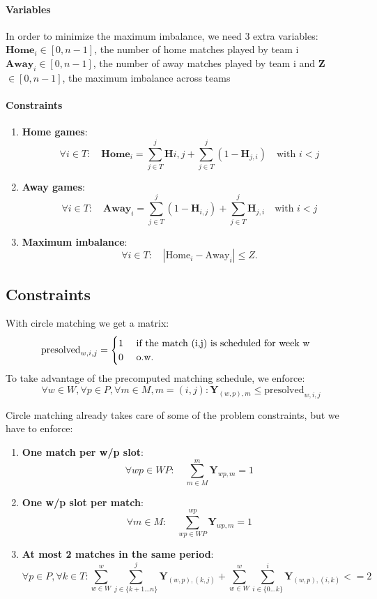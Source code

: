 \paragraph{Variables}
In order to minimize the maximum imbalance, we need 3 extra variables: 
$\textbf{Home}_{i} \in [0,n-1]$, the number of home matches played by team i
$\textbf{Away}_{i} \in [0,n-1]$, the number of away matches played by team i and
\textbf{Z} $ \in [0,n-1]$, the maximum imbalance across teams

\paragraph{Constraints}
\begin{enumerate}
    \item \textbf{Home games}: 
\[\forall i \in T: \quad \textbf{Home}_{i} = \sum_{j \in T}^{j} \textbf{H}{i,j} + \sum_{j \in T}^{j} (1- \textbf{H}_{j,i}) \quad \text{with $i < j$}\]
    \item \textbf{Away games}: 
\[\forall i \in T: \quad \textbf{Away}_{i} = \sum_{j \in T}^{j} (1- \textbf{H}_{i,j}) + \sum_{j \in T}^{j} \textbf{H}_{j,i} \quad \text{with $i < j$}\]
    \item \textbf{Maximum imbalance}: 
\[
\forall i \in T: \quad |\text{Home}_{i} - \text{Away}_{i}| \leq Z.
\]
\end{enumerate}

\subsection{Constraints}
With circle matching we get a matrix:
\[
\text{presolved}_{w,i,j} = 
\begin{cases}
    \text{1 \quad if the match (i,j) is scheduled for week w}\\
    \text{0 \quad o.w.}
\end{cases}
\]
To take advantage of the precomputed matching schedule, we enforce:
\[\forall w \in W, \forall p \in P, \forall m \in M, m = (i,j): \textbf{Y}_{(w,p),m} \leq \text{presolved}_{w,i,j}\]

Circle matching already takes care of some of the problem constraints, but we have to enforce:
\begin{enumerate}
\item \textbf{One match per w/p slot}: 
\[\forall wp \in WP: \quad\sum_{m \in M}^{m} \textbf{Y}_{wp, m} = 1\]
\item \textbf{One w/p slot per match}: 
\[\forall m \in M: \quad\sum_{wp \in WP}^{wp} \textbf{Y}_{wp, m} = 1\]
\item \textbf{At most 2 matches in the same period}: 
\[
\forall p \in P, \forall k \in T:
\sum_{w \in W}^{w}\sum_{j \in \{k+1\dots n\}}^{j} \textbf{Y}_{(w,p), (k,j)} + 
\sum_{w \in W}^{w}\sum_{i \in \{0\dots k\}}^{i} \textbf{Y}_{(w,p), (i,k)} <= 2
\]
\end{enumerate}

